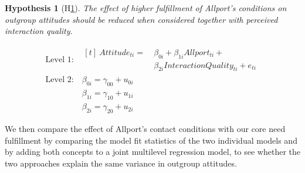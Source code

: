 \documentclass[man, 12pt, a4paper, mask]{apa7}
\theoremstyle{break}
\theoremstyle{plain}
\newtheorem{subhyp}{Hypothesis}
\begin{document}
\begin{mdframed}[style=mdfhypothesis]
    \begin{subhyp}[H\ref{hyp:AttAllportQual}] \label{hyp:AttAllportQual}
    \addtolength{\leftskip}{\subhypskip}
    The effect of higher fulfillment of Allport's conditions on outgroup attitudes should be reduced when considered together with perceived interaction quality.
    \end{subhyp}
    
    \begin{fleqn}[\eqskip]
      \begin{equation} \label{eq:SlopesAttAllportQual}
        \begin{split}
          \textrm{Level 1:} &
            \begin{aligned}[t]
              \ Attitude_{ti} =  &\ \beta_{0i} + \beta_{1i}Allport_{ti} + \\
                                 &\ \beta_{2i}InteractionQuality_{ti} + e_{ti}
            \end{aligned} \\
          \textrm{Level 2:} &\ \beta_{0i} = \gamma_{00} + u_{0i} \\
                            &\ \beta_{1i} = \gamma_{10} + u_{1i} \\
                            &\ \beta_{2i} = \gamma_{20} + u_{2i}
        \end{split} 
      \end{equation}
    \end{fleqn}
\end{mdframed}

We then compare the effect of Allport's contact conditions with our core need fulfillment by comparing the model fit statistics of the two individual models and by adding both concepts to a joint multilevel regression model, to see whether the two approaches explain the same variance in outgroup attitudes.
\end{document}
